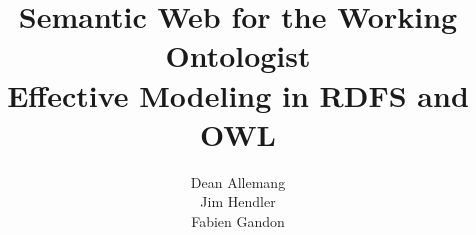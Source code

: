 
\title{Semantic Web for the Working Ontologist\\
\Large Effective Modeling in RDFS and OWL}
\author{Dean Allemang\\
Jim Hendler\\
Fabien Gandon}

\maketitle


\tableofcontents


